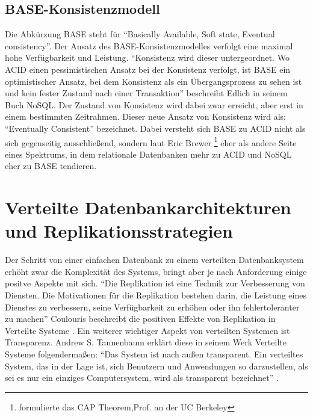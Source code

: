 \documentclass[a4paper,11pt,oneside,%
headsepline,												%
footsepline,												%
bibtotocnumbered									%
]{scrreprt}
\begin{document}
\subsection{BASE-Konsistenzmodell}
\label{BASE}
Die Abkürzung BASE steht für \enquote{Basically Available, Soft state, Eventual consistency}. Der Ansatz des BASE-Konsistenzmodelles verfolgt eine maximal hohe Verfügbarkeit und Leistung. \enquote{Konsistenz wird dieser untergeordnet. Wo ACID einen pessimistischen Ansatz bei der Konsistenz verfolgt, ist BASE ein optimistischer Ansatz, bei dem Konsistenz als ein Übergangsprozess zu sehen ist und kein fester Zustand nach einer Transaktion} beschreibt Edlich in seinem Buch NoSQL\autocite[33, 34]{Edlich2010}. Der Zustand von Konsistenz wird dabei zwar erreicht, aber erst in einem bestimmten Zeitrahmen. Dieser neue Ansatz von Konsistenz wird als: \enquote{Eventually Consistent} bezeichnet. Dabei versteht sich BASE zu ACID nicht als sich gegenseitig ausschließend, sondern laut Eric Brewer \footnote{formulierte das CAP Theorem,Prof. an der UC Berkeley} eher als andere Seite eines Spektrums, in dem relationale Datenbanken mehr zu ACID und NoSQL eher zu BASE tendieren.

\section{Verteilte Datenbankarchitekturen und Replikationsstrategien}
\label{sec:VertDB}
Der Schritt von einer einfachen Datenbank zu einem verteilten Datenbanksystem erhöht zwar die Komplexität des Systems, bringt aber je nach Anforderung einige positve Aspekte mit sich. \enquote{Die Replikation ist eine Technik zur Verbesserung von Diensten. Die Motivationen für die Replikation bestehen darin, die Leistung eines Dienstes zu verbessern, seine Verfügbarkeit zu erhöhen oder ihn fehlertoleranter zu machen} Coulouris beschreibt die positiven Effekte von Replikation in Verteilte Systeme \autocite[642]{Coulouris2002}. Ein weiterer wichtiger Aspekt von verteilten Systemen ist Transparenz. Andrew S. Tannenbaum erklärt diese in seinem Werk Verteilte Systeme folgendermaßen: \enquote{Das System ist nach außen transparent. Ein verteiltes System, das in der Lage ist, sich Benutzern und Anwendungen so darzustellen, als sei es nur ein einziges Computersystem, wird als transparent bezeichnet} \autocite[21]{Tannenbaum2008}.
\end{document}

